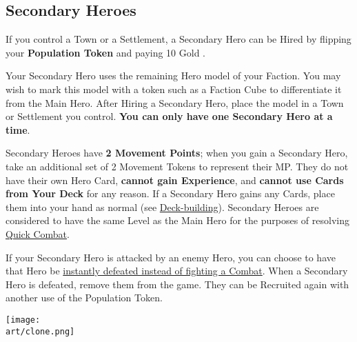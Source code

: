 \begin{multicols*}{2}
{  \subsection*{\hypertarget{Secondary}{Secondary Heroes}}
  If you control a Town or a Settlement, a Secondary Hero can be Hired by flipping your \textbf{Population Token} and paying 10 Gold .\par
  \par
  Your Secondary Hero uses the remaining Hero model of your Faction.
  You may wish to mark this model with a token such as a Faction Cube to differentiate it from the Main Hero.
  After Hiring a Secondary Hero, place the model in a Town or Settlement you control.
  \textbf{You can only have one Secondary Hero at a time}.\par
  Secondary Heroes have \textbf{2 Movement Points}; when you gain a Secondary Hero, take an additional set of 2 Movement Tokens to represent their MP.
  They do not have their own Hero Card, \textbf{cannot gain Experience}, and \textbf{cannot use Cards from Your Deck} for any reason.
  If a Secondary Hero gains any Cards, place them into your hand as normal (see \hyperlink{Playerdecks}{Deck-building}).
  Secondary Heroes are considered to have the same Level as the Main Hero for the purposes of resolving \hyperlink{Quick}{Quick Combat}.\par
  If your Secondary Hero is attacked by an enemy Hero, you can choose to have that Hero be \hyperlink{Endcombat}{instantly defeated instead of fighting a Combat}.
  When a Secondary Hero is defeated, remove them from the game.
  They can be Recruited again with another use of the Population Token.\par
}

\vfill

\hspace{2em}
\texttt{[image: \\art/clone.png]}

\end{multicols*}

\clearpage

